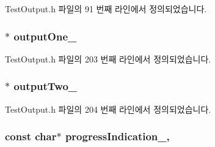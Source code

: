 Test\+Output.\+h 파일의 91 번째 라인에서 정의되었습니다.

\subsubsection[{\texorpdfstring{output\+One\+\_\+}{outputOne_}}]{$\ast$ output\+One\+\_\+\hspace{0.3cm}{\ttfamily [private]}}\hypertarget{class_composite_test_output_ac3af974ee10b6d7e656ce6675df648ec}{}\label{class_composite_test_output_ac3af974ee10b6d7e656ce6675df648ec}


Test\+Output.\+h 파일의 203 번째 라인에서 정의되었습니다.

\subsubsection[{\texorpdfstring{output\+Two\+\_\+}{outputTwo_}}]{$\ast$ output\+Two\+\_\+\hspace{0.3cm}{\ttfamily [private]}}\hypertarget{class_composite_test_output_a7bc3ab8c546a0435d0e8f46b12245883}{}\label{class_composite_test_output_a7bc3ab8c546a0435d0e8f46b12245883}


Test\+Output.\+h 파일의 204 번째 라인에서 정의되었습니다.

\subsubsection[{\texorpdfstring{progress\+Indication\+\_\+}{progressIndication_}}]{\setlength{\rightskip}{0pt plus 5cm}const char$\ast$ progress\+Indication\+\_\+\hspace{0.3cm}{\ttfamily [protected]}, {\ttfamily [inherited]}}\hypertarget{class_test_output_a4cbc8ea3886624399ab3879767d4f018}{}\label{class_test_output_a4cbc8ea3886624399ab3879767d4f018}


